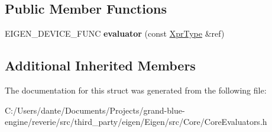 \subsection*{Public Member Functions}
\begin{DoxyCompactItemize}
\item 
\mbox{\label{struct_eigen_1_1internal_1_1evaluator_3_01_ref_3_01_plain_object_type_00_01_ref_options_00_01_stride_type_01_4_01_4_aa40eaa3e61a3df553e893fcf4bc0c837}} 
E\+I\+G\+E\+N\+\_\+\+D\+E\+V\+I\+C\+E\+\_\+\+F\+U\+NC {\bfseries evaluator} (const \mbox{\hyperlink{class_eigen_1_1_ref}{Xpr\+Type}} \&ref)
\end{DoxyCompactItemize}
\subsection*{Additional Inherited Members}


The documentation for this struct was generated from the following file\+:\begin{DoxyCompactItemize}
\item 
C\+:/\+Users/dante/\+Documents/\+Projects/grand-\/blue-\/engine/reverie/src/third\+\_\+party/eigen/\+Eigen/src/\+Core/Core\+Evaluators.\+h\end{DoxyCompactItemize}
